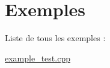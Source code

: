 \section{Exemples}
Liste de tous les exemples \+:\begin{DoxyCompactItemize}
\item 
\hyperlink{example_test_8cpp-example}{example\+\_\+test.\+cpp}
\end{DoxyCompactItemize}
